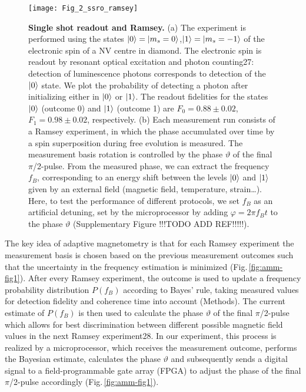 \begin{figure*}
	\centering
	\texttt{[image: Fig\_2\_ssro\_ramsey]}
	\caption{\label{fig:amm-fig2} \textbf{Single shot readout and Ramsey.} (a) The experiment is performed using the states $\left|0\right\rangle = \left|m_s = 0\right\rangle$,$\left|1\right\rangle = \left|m_s = -1\right\rangle$ of the  electronic spin of a NV centre in diamond. The electronic spin is readout by resonant optical excitation and photon counting27: detection of luminescence photons corresponds to detection of the $\left|0\right\rangle$ state. We plot the probability of detecting a photon after initializing either in $\left|0\right\rangle$ or $\left|1\right\rangle$. The readout fidelities for the states $\left|0\right\rangle$ (outcome 0) and $\left|1\right\rangle$  (outcome 1) are $F_0 = 0.88 \pm 0.02$, $F_1 = 0.98 \pm 0.02$, respectively. (b) Each measurement run consists of a Ramsey experiment, in which the phase accumulated over time by a spin superposition during free evolution is measured. The measurement basis rotation is controlled by the phase $\vartheta$ of the final $\pi$/2-pulse. From the measured phase, we can extract the frequency $f_B$, corresponding to an energy shift between the levels $\left|0\right\rangle$ and $\left|1\right\rangle$ given by an external field (magnetic field, temperature, strain…). Here, to test the performance of different protocols, we set $f_B$ as an artificial detuning, set by the microprocessor by adding $\varphi = 2 \pi f_B t$ to the phase $\vartheta$ (Supplementary Figure !!!TODO ADD REF!!!!!).}
\end{figure*}

The key idea of adaptive magnetometry is that for each Ramsey experiment the measurement basis is chosen based on the previous measurement outcomes such that the uncertainty in the frequency estimation is minimized (Fig.\,\ref{fig:amm-fig1}). After every Ramsey experiment, the outcome is used to update a frequency probability distribution $P(f_B)$ according to Bayes’ rule, taking measured values for detection fidelity and coherence time into account (Methods). The current estimate of $P(f_B)$ is then used to calculate the phase $\vartheta$ of the final $\pi$/2-pulse which allows for best discrimination between different possible magnetic field values in the next Ramsey experiment28. In our experiment, this process is realized by a microprocessor, which receives the measurement outcome, performs the Bayesian estimate, calculates the  phase $\vartheta$ and subsequently sends a digital signal to a field-programmable gate array (FPGA) to adjust the phase of the final $\pi$/2-pulse accordingly (Fig.\,\ref{fig:amm-fig1}).

